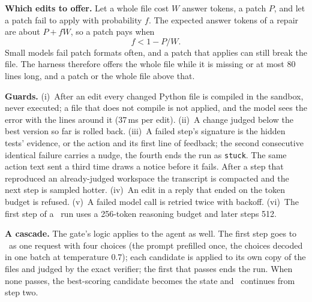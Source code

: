 \textbf{Which edits to offer.} Let a whole file cost $W$ answer tokens, a
patch $P$, and let a patch fail to apply with probability $f$. The expected
answer tokens of a repair are about $P+fW$, so a patch pays when
\begin{equation}
f<1-P/W .
\label{eq:patch}
\end{equation}
Small models fail patch formats often, and a patch that applies can still
break the file. The harness therefore offers the whole file while it is
missing or at most 80 lines long, and a patch or the whole file above that.

\textbf{Guards.} (i)~After an edit every changed Python file is compiled in
the sandbox, never executed; a file that does not compile is not applied, and
the model sees the error with the lines around it (37\,ms per edit).
(ii)~A change judged below the best version so far is rolled back.
(iii)~A failed step's signature is the hidden tests' evidence, or the action
and its first line of feedback; the second consecutive identical failure
carries a nudge, the fourth ends the run as \texttt{stuck}. The same action
text sent a third time draws a notice before it fails. After a step that
reproduced an already-judged workspace the transcript is compacted and the
next step is sampled hotter. (iv)~An edit in a reply that ended on the token
budget is refused. (v)~A failed model call is retried twice with backoff.
(vi)~The first step of a \Stwo\ run uses a 256-token reasoning budget and
later steps 512.

\textbf{A cascade.} The gate's logic applies to the agent as well. The first
step goes to \Sone\ as one request with four choices (the prompt prefilled
once, the choices decoded in one batch at temperature 0.7); each candidate is
applied to its own copy of the files and judged by the exact verifier; the
first that passes ends the run. When none passes, the best-scoring candidate
becomes the state and \Stwo\ continues from step two.
